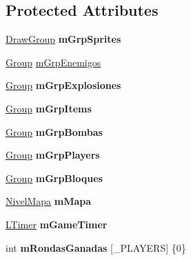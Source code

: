 \subsection*{Protected Attributes}
\begin{DoxyCompactItemize}
\item 
\hyperlink{class_draw_group}{Draw\+Group} {\bfseries m\+Grp\+Sprites}\hypertarget{class_juego_a16954a5304977010c10d4a2947904a37}{}\label{class_juego_a16954a5304977010c10d4a2947904a37}

\item 
\hyperlink{class_group}{Group} \hyperlink{class_juego_a21212e537ac309102310b5d6eec8b05d}{m\+Grp\+Enemigos}
\item 
\hyperlink{class_group}{Group} {\bfseries m\+Grp\+Explosiones}\hypertarget{class_juego_afec10123c9056d6dc1094afaf63f9669}{}\label{class_juego_afec10123c9056d6dc1094afaf63f9669}

\item 
\hyperlink{class_group}{Group} {\bfseries m\+Grp\+Items}\hypertarget{class_juego_ad89bd5035fc5f83405888aa142e9507b}{}\label{class_juego_ad89bd5035fc5f83405888aa142e9507b}

\item 
\hyperlink{class_group}{Group} {\bfseries m\+Grp\+Bombas}\hypertarget{class_juego_ad70d8722d5672bfb50a188a81498ad0e}{}\label{class_juego_ad70d8722d5672bfb50a188a81498ad0e}

\item 
\hyperlink{class_group}{Group} {\bfseries m\+Grp\+Players}\hypertarget{class_juego_aefb7102b721b960b92541885939d7340}{}\label{class_juego_aefb7102b721b960b92541885939d7340}

\item 
\hyperlink{class_group}{Group} {\bfseries m\+Grp\+Bloques}\hypertarget{class_juego_a0da19321eebedd555c12fa8097c10945}{}\label{class_juego_a0da19321eebedd555c12fa8097c10945}

\item 
\hyperlink{class_nivel_mapa}{Nivel\+Mapa} {\bfseries m\+Mapa}\hypertarget{class_juego_a1288a8df975edac44f406f5fb3b057f7}{}\label{class_juego_a1288a8df975edac44f406f5fb3b057f7}

\item 
\hyperlink{class_l_timer}{L\+Timer} {\bfseries m\+Game\+Timer}\hypertarget{class_juego_afd3ce8f8b6c1e021c81a09a28a95485d}{}\label{class_juego_afd3ce8f8b6c1e021c81a09a28a95485d}

\item 
int {\bfseries m\+Rondas\+Ganadas} \mbox{[}\+\_\+\+P\+L\+A\+Y\+E\+RS\mbox{]} \{0\}\hypertarget{class_juego_a4ccf29a52fb8b5512521f8e0473b442c}{}\label{class_juego_a4ccf29a52fb8b5512521f8e0473b442c}


\end{DoxyCompactItemize}
